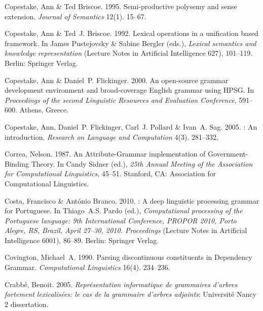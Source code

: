 \begin{thebibliography}{1420}
Copestake, Ann \& Ted Briscoe. 1995.
\newblock Semi-productive polysemy and sense extension.
\newblock \emph{Journal of Semantics} 12(1). 15--67.

Copestake, Ann \& Ted~J. Briscoe. 1992.
\newblock Lexical operations in a unification based framework.
\newblock In James Pustejovsky \& Sabine Bergler (eds.), \emph{Lexical
  semantics and knowledge representation} (Lecture Notes in Artificial
  Intelligence 627), 101--119. Berlin: Springer Verlag.

Copestake, Ann \& Daniel~P. Flickinger. 2000.
\newblock An open-source grammar development environment and broad-coverage
  {English} grammar using {HPSG}.
\newblock In \emph{Proceedings of the second {Linguistic Resources and
  Evaluation Conference}}, 591--600. Athens, Greece.

Copestake, Ann, Daniel~P. Flickinger, Carl~J. Pollard \& Ivan~A. Sag. 2005.
: {An} introduction.
\newblock \emph{Research on Language and Computation} 4(3). 281--332.

Correa, Nelson. 1987.
\newblock An {Attribute-Grammar} implementation of {Government-Binding Theory}.
\newblock In Candy Sidner (ed.), \emph{25th {Annual Meeting of the Association
  for Computational Linguistics}}, 45--51. Stanford, CA: Association for
  Computational Linguistics.

Costa, Francisco \& Ant{\'o}nio Branco. 2010.
: {A} deep linguistic processing grammar for {Portuguese}.
\newblock In Thiago~A.S. Pardo (ed.), \emph{Computational processing of the
  {Portuguese} language: {9th International Conference, PROPOR 2010, Porto
  Alegre, RS, Brazil, April 27--30, 2010}. {Proceedings}} (Lecture Notes in
  Artificial Intelligence 6001), 86--89. Berlin: Springer Verlag.

Covington, Michael~A. 1990.
\newblock Parsing discontinuous constituents in {Dependency Grammar}.
\newblock \emph{Computational Linguistics} 16(4). 234--236.

Crabb\'e, Benoit. 2005.
\newblock \emph{Repr\'esentation informatique de grammaires d'arbres fortement
  lexicalis\'ees: le cas de la grammaire d'arbres adjoints}: Universit\'e Nancy
  2 dissertation.


\end{thebibliography}
